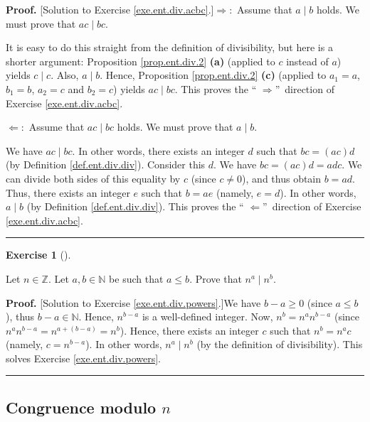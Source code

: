 \documentclass[numbers=enddot,12pt,final,onecolumn,notitlepage]{scrartcl}%
\newcounter{exer}
\numberwithin{exer}{subsection}
\theoremstyle{definition}
\newtheorem{exmp}[exer]{Exercise}
\newenvironment{exercise}[1][]
{\begin{exmp}[#1]\begin{leftbar}}
{\end{leftbar}\end{exmp}}
\newenvironment{fineprint}{\begin{small}}{\end{small}}
\newenvironment{proof}[1][Proof]{\noindent\textbf{#1.} }{\ \rule{0.5em}{0.5em}}
\begin{document}
\begin{fineprint}
\begin{proof}
[Solution to Exercise \ref{exe.ent.div.acbc}.]$\Longrightarrow:$ Assume that
$a\mid b$ holds. We must prove that $ac\mid bc$.

It is easy to do this straight from the definition of divisibility, but here
is a shorter argument: Proposition \ref{prop.ent.div.2} \textbf{(a)} (applied
to $c$ instead of $a$) yields $c\mid c$. Also, $a\mid b$. Hence, Proposition
\ref{prop.ent.div.2} \textbf{(c)} (applied to $a_{1}=a$, $b_{1}=b$, $a_{2}=c$
and $b_{2}=c$) yields $ac\mid bc$. This proves the \textquotedblleft%
$\Longrightarrow$\textquotedblright\ direction of Exercise
\ref{exe.ent.div.acbc}.

$\Longleftarrow:$ Assume that $ac\mid bc$ holds. We must prove that $a\mid b$.

We have $ac\mid bc$. In other words, there exists an integer $d$ such that
$bc=\left(  ac\right)  d$ (by Definition \ref{def.ent.div.div}). Consider this
$d$. We have $bc=\left(  ac\right)  d=adc$. We can divide both sides of this
equality by $c$ (since $c\neq0$), and thus obtain $b=ad$. Thus, there exists
an integer $e$ such that $b=ae$ (namely, $e=d$). In other words, $a\mid b$ (by
Definition \ref{def.ent.div.div}). This proves the \textquotedblleft%
$\Longleftarrow$\textquotedblright\ direction of Exercise
\ref{exe.ent.div.acbc}.
\end{proof}
\end{fineprint}

\begin{exercise}
\label{exe.ent.div.powers}Let $n\in\mathbb{Z}$. Let $a,b\in\mathbb{N}$ be such
that $a\leq b$. Prove that $n^{a}\mid n^{b}$.
\end{exercise}

\begin{fineprint}
\begin{proof}
[Solution to Exercise \ref{exe.ent.div.powers}.]We have $b-a\geq0$ (since
$a\leq b$), thus $b-a\in\mathbb{N}$. Hence, $n^{b-a}$ is a well-defined
integer. Now, $n^{b}=n^{a}n^{b-a}$ (since $n^{a}n^{b-a}=n^{a+\left(
b-a\right)  }=n^{b}$). Hence, there exists an integer $c$ such that
$n^{b}=n^{a}c$ (namely, $c=n^{b-a}$). In other words, $n^{a}\mid n^{b}$ (by
the definition of divisibility). This solves Exercise \ref{exe.ent.div.powers}.
\end{proof}
\end{fineprint}

\subsection{Congruence modulo $n$}
\end{document}
